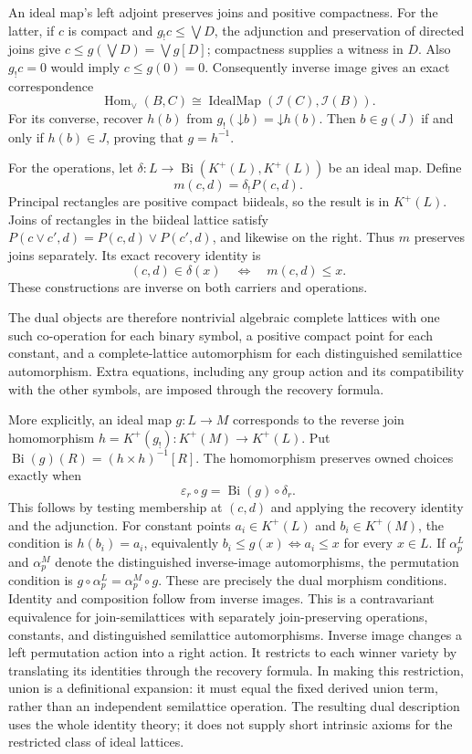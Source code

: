 An ideal map's left adjoint preserves joins and positive compactness.
For the latter, if $c$ is compact and $g_!c\leq\bigvee D$, the adjunction
and preservation of directed joins give
$c\leq g(\bigvee D)=\bigvee g[D]$; compactness supplies a witness in $D$.
Also $g_!c=0$ would imply $c\leq g(0)=0$.
Consequently inverse image gives an exact correspondence
\[
 \operatorname{Hom}_{\vee}(B,C)
 \cong\operatorname{IdealMap}(\mathcal I(C),\mathcal I(B)).
\]
For its converse, recover $h(b)$ from
$g_!(\mathord\downarrow b)=\mathord\downarrow h(b)$.
Then $b\in g(J)$ if and only if $h(b)\in J$, proving that $g=h^{-1}$.

For the operations, let
$\delta:L\to\operatorname{Bi}(K^+(L),K^+(L))$ be an ideal map. Define
\[
 m(c,d)=\delta_!P(c,d).
\]
Principal rectangles are positive compact biideals, so the result is in
$K^+(L)$. Joins of rectangles in the biideal lattice satisfy
$P(c\vee c',d)=P(c,d)\vee P(c',d)$, and likewise on the right.
Thus $m$ preserves joins separately. Its exact recovery identity is
\[
 (c,d)\in\delta(x)\quad\Longleftrightarrow\quad m(c,d)\leq x.
\]
These constructions are inverse on both carriers and operations.

The dual objects are therefore nontrivial algebraic complete lattices
with one such co-operation for each binary symbol, a positive compact
point for each constant, and a complete-lattice automorphism for each
distinguished semilattice automorphism. Extra equations, including any
group action and its compatibility with the other symbols, are imposed
through the recovery formula.

More explicitly, an ideal map $g:L\to M$ corresponds to the reverse
join homomorphism $h=K^+(g_!):K^+(M)\to K^+(L)$. Put
$\operatorname{Bi}(g)(R)=(h\times h)^{-1}[R]$. The homomorphism preserves
owned choices exactly when
\[
 \varepsilon_r\circ g=\operatorname{Bi}(g)\circ\delta_r.
\]
This follows by testing membership at $(c,d)$ and applying the recovery
identity and the adjunction. For constant points $a_i\in K^+(L)$ and
$b_i\in K^+(M)$, the condition is $h(b_i)=a_i$, equivalently
$b_i\leq g(x)\Longleftrightarrow a_i\leq x$ for every $x\in L$.
If $\alpha_p^L$ and $\alpha_p^M$ denote the distinguished inverse-image
automorphisms, the permutation condition is
$g\circ\alpha_p^L=\alpha_p^M\circ g$.
These are precisely the dual morphism conditions. Identity and composition
follow from inverse images. This is a contravariant equivalence for
join-semilattices with separately join-preserving operations, constants,
and distinguished semilattice automorphisms. Inverse image changes a
left permutation action into a right action.
It restricts to each winner variety by translating its identities through
the recovery formula. In making this restriction, union is a definitional
expansion: it must equal the fixed derived union term, rather than an
independent semilattice operation. The resulting dual description uses
the whole identity theory; it does not supply short intrinsic axioms for
the restricted class of ideal lattices.
